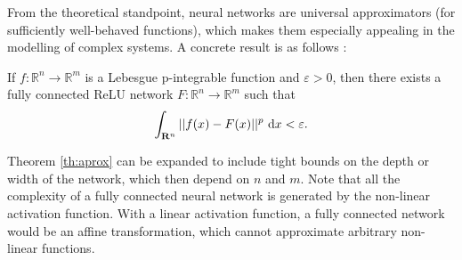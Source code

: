 From the theoretical standpoint, neural networks are universal approximators (for sufficiently well-behaved functions), which makes them especially appealing in the modelling of complex systems. A concrete result is as follows \cite{universal_aprox}:

\begin{theorem}\label{th:aprox}

    If $f\colon \mathbb{R}^n \to \mathbb{R}^m$ is a Lebesgue p-integrable function and $\varepsilon>0$, then there exists a fully connected ReLU network $F\colon \mathbb{R}^n \to \mathbb{R}^m$ such that
    $$
        \int_{\mathbf{R}^n}||f(x)-F(x) ||^p\ \differential x <\varepsilon.
    $$
\end{theorem}
Theorem \ref{th:aprox} can be expanded to include tight bounds on the depth or width of the network, which then depend on $n$ and $m$. Note that all the complexity of a fully connected neural network is generated by the non-linear activation function. With a linear activation function, a fully connected network would be an affine transformation, which cannot approximate arbitrary non-linear functions.

